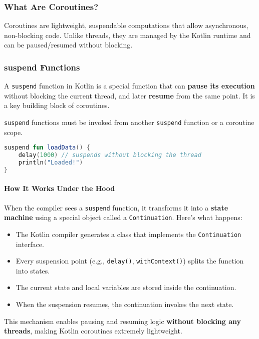 \documentclass[a4paper,12pt]{article}
\begin{document}
\subsubsection{What Are Coroutines?}
Coroutines are lightweight, suspendable computations that allow asynchronous, non-blocking code. Unlike threads, they are managed by the Kotlin runtime and can be paused/resumed without blocking.

\subsubsection{suspend Functions}

A \texttt{suspend} function in Kotlin is a special function that can \textbf{pause its execution} without blocking the current thread, and later \textbf{resume} from the same point. It is a key building block of coroutines.

\texttt{suspend} functions must be invoked from another \texttt{suspend} function or a coroutine scope.

\begin{lstlisting}[language=Kotlin]
suspend fun loadData() {
    delay(1000) // suspends without blocking the thread
    println("Loaded!")
}
\end{lstlisting}

\paragraph{How It Works Under the Hood}

When the compiler sees a \texttt{suspend} function, it transforms it into a \textbf{state machine} using a special object called a \texttt{Continuation}. Here's what happens:

\begin{itemize}
  \item The Kotlin compiler generates a class that implements the \texttt{Continuation} interface.
  \item Every suspension point (e.g., \texttt{delay()}, \texttt{withContext()}) splits the function into states.
  \item The current state and local variables are stored inside the continuation.
  \item When the suspension resumes, the continuation invokes the next state.
\end{itemize}

This mechanism enables pausing and resuming logic \textbf{without blocking any threads}, making Kotlin coroutines extremely lightweight.
\end{document}
